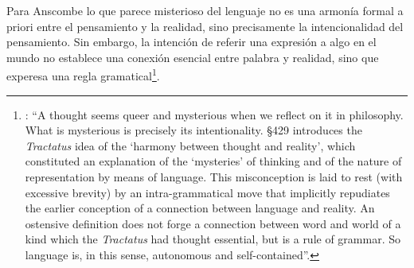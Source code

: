 Para Anscombe lo que parece misterioso del lenguaje no es una armonía formal a priori entre el pensamiento y la realidad, sino precisamente la intencionalidad del pensamiento. Sin embargo, la intención de referir una expresión a algo en el mundo no establece una conexión esencial entre palabra y realidad, sino que experesa una regla gramatical\footnote{\cite[4]{hacker2000mind}: \enquote{A thought seems queer and mysterious when we reflect on it in philosophy. What is mysterious is precisely its intentionality. \S429 introduces the \emph{Tractatus} idea of the `harmony between thought and reality', which constituted an explanation of the `mysteries' of thinking and of the nature of representation by means of language. This misconception is laid to rest (with excessive brevity) by an intra-grammatical move that implicitly repudiates the earlier conception of a connection between language and reality. An ostensive definition does not forge a connection between word and world of a kind which the \emph{Tractatus} had thought essential, but is a rule of grammar. So language is, in this sense, autonomous and self-contained}.}.
